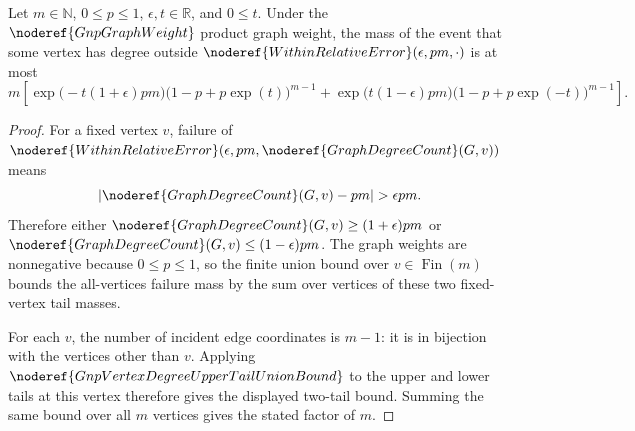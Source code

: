 \begin{helper}[GnpAllVerticesDegreeFailureUnionBound]
Let \(m\in\mathbb N\), \(0\le p\le1\), \(\epsilon,t\in\mathbb R\), and
\(0\le t\).  Under the \(\noderef{GnpGraphWeight}\) product graph weight,
the mass of the event that some vertex has degree outside
\(\noderef{WithinRelativeError}(\epsilon,pm,\cdot)\) is at most
\[
m\left[
\exp\!\bigl(-t(1+\epsilon)pm\bigr)
\bigl(1-p+p\exp(t)\bigr)^{m-1}
+
\exp\!\bigl(t(1-\epsilon)pm\bigr)
\bigl(1-p+p\exp(-t)\bigr)^{m-1}
\right].
\]
\end{helper}
\begin{proof}
For a fixed vertex \(v\), failure of
\(\noderef{WithinRelativeError}(\epsilon,pm,\noderef{GraphDegreeCount}(G,v))\)
means
\[
|\noderef{GraphDegreeCount}(G,v)-pm|>\epsilon pm.
\]
Therefore either
\(\noderef{GraphDegreeCount}(G,v)\ge (1+\epsilon)pm\) or
\(\noderef{GraphDegreeCount}(G,v)\le (1-\epsilon)pm\).  The graph weights are
nonnegative because \(0\le p\le1\), so the finite union bound over
\(v\in\operatorname{Fin}(m)\) bounds the all-vertices failure mass by the sum
over vertices of these two fixed-vertex tail masses.

For each \(v\), the number of incident edge coordinates is \(m-1\): it is in
bijection with the vertices other than \(v\).  Applying
\(\noderef{GnpVertexDegreeUpperTailUnionBound}\) to the upper and lower tails
at this vertex therefore gives the displayed two-tail bound.  Summing the
same bound over all \(m\) vertices gives the stated factor of \(m\).
\end{proof}
